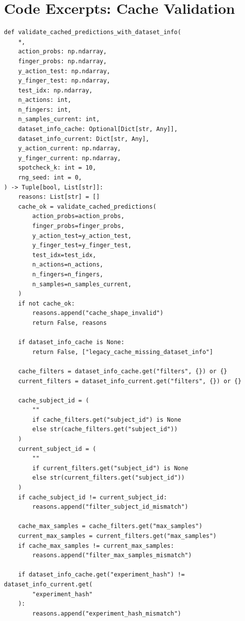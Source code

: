 \documentclass[11pt,openany]{book}
\begin{document}
\section{Code Excerpts: Cache Validation}

\begin{lstlisting}[language=PythonSafe,caption={Excerpt from \texttt{\detokenize{utils/eval_utils.py}} L54--L113}]
def validate_cached_predictions_with_dataset_info(
    *,
    action_probs: np.ndarray,
    finger_probs: np.ndarray,
    y_action_test: np.ndarray,
    y_finger_test: np.ndarray,
    test_idx: np.ndarray,
    n_actions: int,
    n_fingers: int,
    n_samples_current: int,
    dataset_info_cache: Optional[Dict[str, Any]],
    dataset_info_current: Dict[str, Any],
    y_action_current: np.ndarray,
    y_finger_current: np.ndarray,
    spotcheck_k: int = 10,
    rng_seed: int = 0,
) -> Tuple[bool, List[str]]:
    reasons: List[str] = []
    cache_ok = validate_cached_predictions(
        action_probs=action_probs,
        finger_probs=finger_probs,
        y_action_test=y_action_test,
        y_finger_test=y_finger_test,
        test_idx=test_idx,
        n_actions=n_actions,
        n_fingers=n_fingers,
        n_samples=n_samples_current,
    )
    if not cache_ok:
        reasons.append("cache_shape_invalid")
        return False, reasons

    if dataset_info_cache is None:
        return False, ["legacy_cache_missing_dataset_info"]

    cache_filters = dataset_info_cache.get("filters", {}) or {}
    current_filters = dataset_info_current.get("filters", {}) or {}

    cache_subject_id = (
        ""
        if cache_filters.get("subject_id") is None
        else str(cache_filters.get("subject_id"))
    )
    current_subject_id = (
        ""
        if current_filters.get("subject_id") is None
        else str(current_filters.get("subject_id"))
    )
    if cache_subject_id != current_subject_id:
        reasons.append("filter_subject_id_mismatch")

    cache_max_samples = cache_filters.get("max_samples")
    current_max_samples = current_filters.get("max_samples")
    if cache_max_samples != current_max_samples:
        reasons.append("filter_max_samples_mismatch")

    if dataset_info_cache.get("experiment_hash") != dataset_info_current.get(
        "experiment_hash"
    ):
        reasons.append("experiment_hash_mismatch")
\end{lstlisting}
\end{document}
